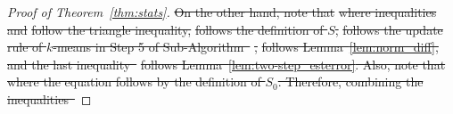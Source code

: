 \documentclass[lettersize,onecolumn,journal]{IEEEtran}
\theoremstyle{definition}
\theoremstyle{definition}
\newcommand{\of}[1]{\left(#1\right)}
\newcommand{\off}[1]{\left[#1\right]}
\providecommand{\DIFdeltex}[1]{{\protect\color{red}\sout{#1}}}                      %
\providecommand{\DIFdel}[1]{\texorpdfstring{\DIFdeltex{#1}}{}} %
\begin{document}
\begin{proof}[Proof of Theorem~\ref{thm:stats}]
\DIFdel{On the other hand, note that 
    }%
\DIFdel{where inequalities }%
\DIFdel{and }%
\DIFdel{follow the triangle inequality, }%
\DIFdel{follows the definition of $S$, }%
\DIFdel{follows the update rule of $k$-means in Step 5 of Sub-Algorithm~}%
\DIFdel{, }%
\DIFdel{follows Lemma~\ref{lem:norm_diff}, and the last inequality~}%
\DIFdel{follows Lemma~\ref{lem:two-step_esterror}. Also, note that 
    }%
\DIFdel{where the equation follows by the definition of $S_0$. Therefore, combining the inequalities~}%

\end{proof}
\end{document}
